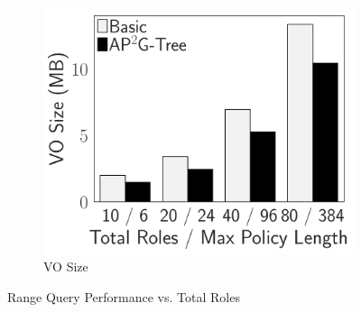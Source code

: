 \begin{figure}[t]
\begin{subfigure}{.33\linewidth}
        \includegraphics[width=\linewidth]{exp-figs/access-control/policy_2_vo.pdf}
        \caption{VO Size}
    \end{subfigure}
    \caption{Range Query Performance vs. Total Roles}\label{exp-fig:access-control:policy_2}
\end{figure}
